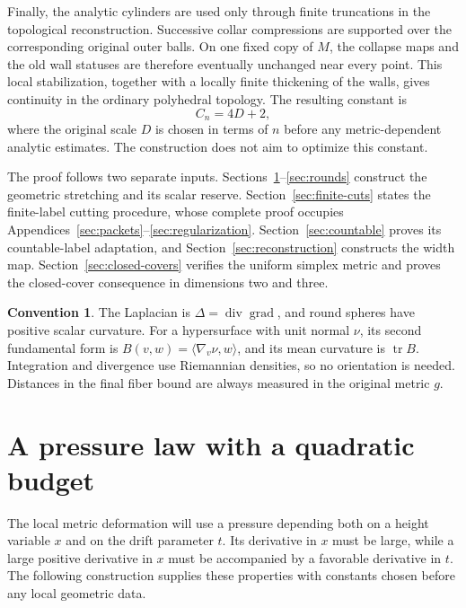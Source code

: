 \documentclass[11pt]{article}
\numberwithin{equation}{section}
\theoremstyle{definition}
\newtheorem{convention}[theorem]{Convention}
\theoremstyle{remark}
\begin{document}
Finally, the analytic cylinders are used only through finite
truncations in the topological reconstruction. Successive collar
compressions are supported over the corresponding original outer
balls. On one fixed copy of \(M\), the collapse maps and the old wall
statuses are therefore eventually unchanged near every point. This
local stabilization, together with a locally finite thickening of the
walls, gives continuity in the ordinary polyhedral topology. The
resulting constant is
\[
 C_n=4D+2,
\]
where the original scale \(D\) is chosen in terms of \(n\) before any
metric-dependent analytic estimates. The construction does not aim to optimize this constant.

The proof follows two separate inputs. Sections~\ref{pressure:section}--\ref{sec:rounds}
construct the geometric stretching and its scalar reserve.
Section~\ref{sec:finite-cuts} states the finite-label cutting procedure,
whose complete proof occupies Appendices~\ref{sec:packets}--\ref{sec:regularization}.
Section~\ref{sec:countable} proves its countable-label adaptation, and
Section~\ref{sec:reconstruction} constructs the width map.
Section~\ref{sec:closed-covers} verifies the uniform simplex metric and
proves the closed-cover consequence in dimensions two and three.

\begin{convention}\label{conv:signs}
The Laplacian is \(\Delta=\operatorname{div}\operatorname{grad}\), and round spheres have positive
scalar curvature. For a hypersurface with unit normal \(\nu\), its
second fundamental form is
\(B(v,w)=\langle\nabla_v\nu,w\rangle\), and its mean curvature is
\(\operatorname{tr} B\). Integration and divergence use Riemannian densities, so no
orientation is needed. Distances in the final fiber bound are always
measured in the original metric \(g\).
\end{convention}

\section{A pressure law with a quadratic budget}
\label{pressure:section}

The local metric deformation will use a pressure depending both on a height
variable $x$ and on the drift parameter $t$.  Its derivative in $x$ must be
large, while a large positive derivative in $x$ must be accompanied by a
favorable derivative in $t$.  The following construction supplies these
properties with constants chosen before any local geometric data.
\end{document}
